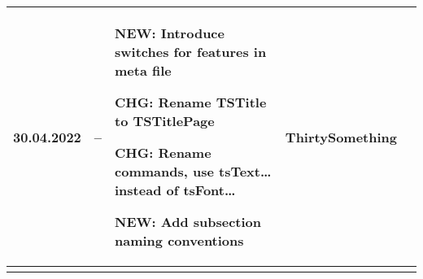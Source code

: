 \begin{tiny}
\begin{longtable}{ | p{} | p{} | p{} | P{0.49\textwidth} | p{0.15\textwidth} | }
        30.04.2022               &
        --                       &
        \begin{tsLTItemize}
            \item NEW: Introduce switches for features in meta file
            \item CHG: Rename TSTitle to TSTitlePage
            \item CHG: Rename commands, use tsText\ldots instead of tsFont\ldots
            \item NEW: Add subsection naming conventions
        \end{tsLTItemize}
                                 &
        ThirtySomething            \\
        \hline
    \end{longtable}
\end{tiny}
